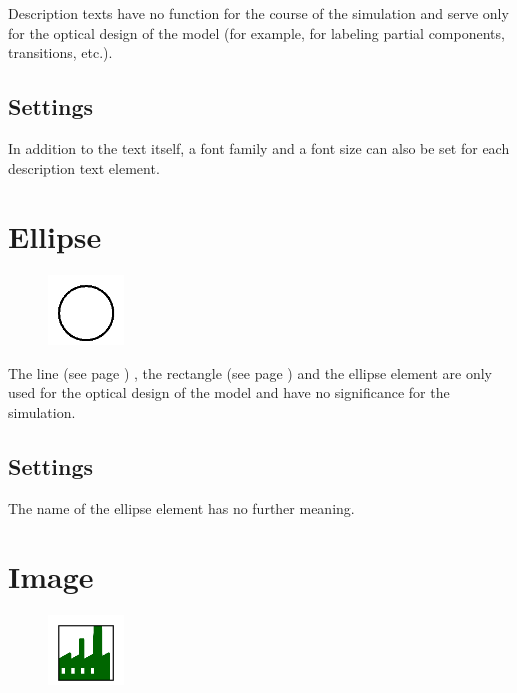 Description texts have no function for the course of the simulation
and serve only for the optical design of the model
(for example, for labeling partial components, transitions, etc.).

\subsection*{Settings}

In addition to the text itself, a font family and a font size can also be set for each description text element.


\section{Ellipse}
\label{ref:ModelElementEllipse}

\begin{figure}
\vspace{-22pt}
\includegraphics[width=2cm]{imageModelElementEllipse.png}
\vspace{-22pt}
\end{figure}

The line (see page \pageref{ref:ModelElementLine}) , the rectangle (see page \pageref{ref:ModelElementRectangle}) 
and the ellipse element are only used for the optical design of the model and have no significance for the simulation.

\subsection*{Settings}

The name of the ellipse element has no further meaning.


\section{Image}
\label{ref:ModelElementImage}

\begin{figure}
\vspace{-22pt}
\includegraphics[width=2cm]{imageModelElementImage.png}
\vspace{-22pt}
\end{figure}

